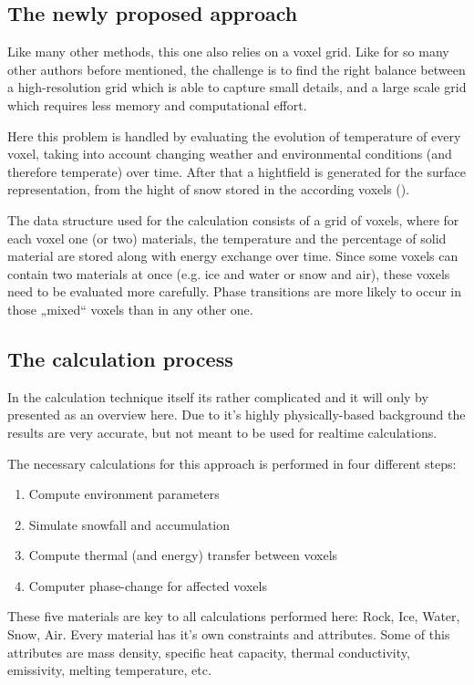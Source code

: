 \subsection{The newly proposed approach}
Like many other methods, this one also relies on a voxel grid. Like for so many other authors before mentioned, the challenge is to find the right balance between a high-resolution grid which is able to capture small details, and a large scale grid which requires less memory and computational effort.

Here this problem is handled by evaluating the evolution of temperature of every voxel, taking into account changing weather and environmental conditions (and therefore temperate) over time. After that a hightfield is generated for the surface representation, from the hight of snow stored in the according voxels ().

The data structure used for the calculation consists of a grid of voxels, where for each voxel one (or two) materials, the temperature and the percentage of solid material are stored along with energy exchange over time. Since some voxels can contain two materials at once (e.g. ice and water or snow and air), these voxels need to be evaluated more carefully. Phase transitions are more likely to occur in those „mixed“ voxels than in any other one.

\subsection{The calculation process}
In the calculation technique itself its rather complicated and it will only by presented as an overview here. Due to it’s highly physically-based background the results are very accurate, but not meant to be used for realtime calculations.

The necessary calculations for this approach is performed in four different steps:
\begin{enumerate}
	\item Compute environment parameters
	\item Simulate snowfall and accumulation
	\item Compute thermal (and energy) transfer between voxels
	\item Computer phase-change for affected voxels
\end{enumerate}

These five materials are key to all calculations performed here: Rock, Ice, Water, Snow, Air. Every material has it’s own constraints and attributes. Some of this attributes are mass density, specific heat capacity, thermal conductivity, emissivity, melting temperature, etc.

